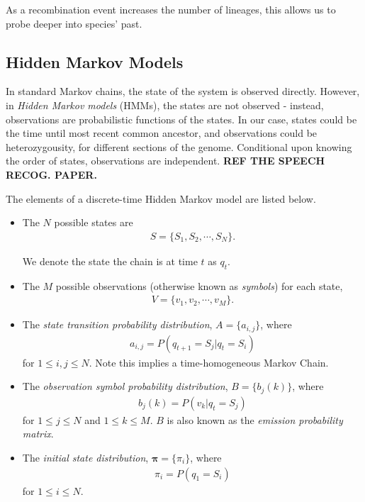 \documentclass[12pt]{article}
\begin{document}
As a recombination event increases the number of lineages, this allows us to probe deeper into species' past.

\subsection{Hidden Markov Models}\label{ssec:HMM}
In standard Markov chains, the state of the system is observed directly. However, in \emph{Hidden Markov models} (HMMs), the states are not observed - instead, observations are probabilistic functions of the states. In our case, states could be the time until most recent common ancestor, and observations could be heterozygousity, for different sections of the genome. Conditional upon knowing the order of states, observations are independent. \textbf{REF THE SPEECH RECOG. PAPER.}

The elements of a discrete-time Hidden Markov model are listed below.
\begin{itemize}
\item The $N$ possible states are
  \begin{eqnarray*}
    S=\{S_1,S_2,\cdots,S_N\}.
  \end{eqnarray*}

  We denote the state the chain is at time $t$ as $q_t$.
\item The $M$ possible observations (otherwise known as \emph{symbols}) for each state,
    \begin{eqnarray*}
    V=\{v_1,v_2,\cdots,v_M\}.
  \end{eqnarray*}
  \item The \emph{state transition probability distribution}, $A=\{a_{i,j}\}$, where  
\begin{eqnarray*}
a_{i,j}=P(q_{t+1}=S_j|q_t=S_i)
\end{eqnarray*}
for $1\le i,j \le N$. Note this implies a time-homogeneous Markov Chain.
    
\item The \emph{observation symbol probability distribution}, $B=\{b_j(k)\}$, where
\begin{eqnarray*}
b_j(k)=P(v_k|q_t=S_j)
\end{eqnarray*}
for $1\le j\le N$ and $1\le k \le M$. $B$ is also known as the \emph{emission probability matrix}.
\item The \emph{initial state distribution}, $\bm{\pi}=\{\pi_i\}$, where
  \begin{eqnarray*}
    \pi_i=P(q_1=S_i)
  \end{eqnarray*}
for $1\le i\le N$.
\end{itemize}
\end{document}
